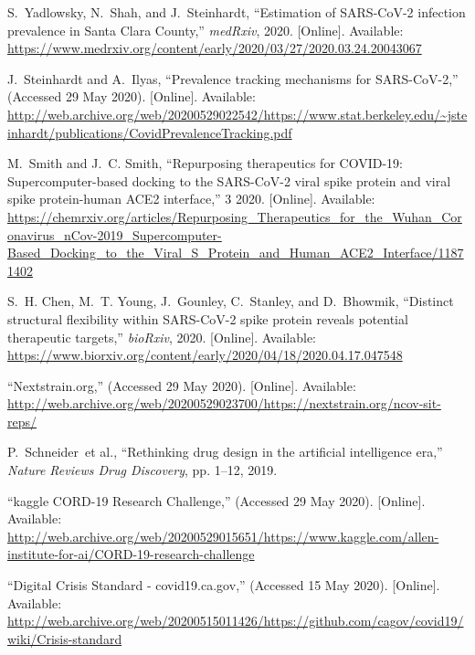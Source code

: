 \documentclass[11pt]{article}
\begin{document}
\begin{thebibliography}{10}
\BIBentryALTinterwordspacing
S.~Yadlowsky, N.~Shah, and J.~Steinhardt, ``{Estimation of SARS-CoV-2 infection
  prevalence in Santa Clara County},'' \emph{medRxiv}, 2020. [Online].
  Available:
  \url{https://www.medrxiv.org/content/early/2020/03/27/2020.03.24.20043067}
\BIBentrySTDinterwordspacing

\BIBentryALTinterwordspacing
J.~Steinhardt and A.~Ilyas, ``{Prevalence tracking mechanisms for
  SARS-CoV-2},'' (Accessed 29 May 2020). [Online]. Available:
  \url{http://web.archive.org/web/20200529022542/https://www.stat.berkeley.edu/~jsteinhardt/publications/CovidPrevalenceTracking.pdf}
\BIBentrySTDinterwordspacing

\BIBentryALTinterwordspacing
M.~Smith and J.~C. Smith, ``{Repurposing therapeutics for COVID-19:
  Supercomputer-based docking to the SARS-CoV-2 viral spike protein and viral
  spike protein-human ACE2 interface},'' 3 2020. [Online]. Available:
  \url{https://chemrxiv.org/articles/Repurposing_Therapeutics_for_the_Wuhan_Coronavirus_nCov-2019_Supercomputer-Based_Docking_to_the_Viral_S_Protein_and_Human_ACE2_Interface/11871402}
\BIBentrySTDinterwordspacing

\BIBentryALTinterwordspacing
S.~H. Chen, M.~T. Young, J.~Gounley, C.~Stanley, and D.~Bhowmik, ``{Distinct
  structural flexibility within SARS-CoV-2 spike protein reveals potential
  therapeutic targets},'' \emph{bioRxiv}, 2020. [Online]. Available:
  \url{https://www.biorxiv.org/content/early/2020/04/18/2020.04.17.047548}
\BIBentrySTDinterwordspacing

\BIBentryALTinterwordspacing
``{Nextstrain.org},'' (Accessed 29 May 2020). [Online]. Available:
  \url{http://web.archive.org/web/20200529023700/https://nextstrain.org/ncov-sit-reps/}
\BIBentrySTDinterwordspacing

P.~Schneider~et al., ``Rethinking drug design in the artificial intelligence
  era,'' \emph{Nature Reviews Drug Discovery}, pp. 1--12, 2019.

\BIBentryALTinterwordspacing
``{kaggle CORD-19 Research Challenge},'' (Accessed 29 May 2020). [Online].
  Available:
  \url{http://web.archive.org/web/20200529015651/https://www.kaggle.com/allen-institute-for-ai/CORD-19-research-challenge}
\BIBentrySTDinterwordspacing

\BIBentryALTinterwordspacing
``{Digital Crisis Standard - covid19.ca.gov},'' (Accessed 15 May 2020).
  [Online]. Available:
  \url{http://web.archive.org/web/20200515011426/https://github.com/cagov/covid19/wiki/Crisis-standard}
\BIBentrySTDinterwordspacing


\end{thebibliography}
\end{document}
